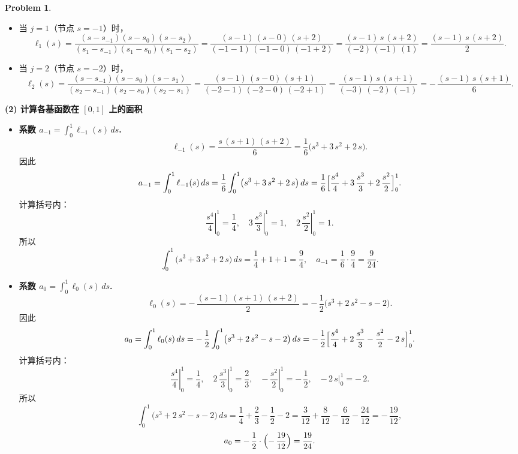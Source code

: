 \documentclass[a4paper]{article}
\theoremstyle{definition}
\newtheorem{problem}{Problem}
\theoremstyle{plain}
\newcommand{\<}{\left<}
\renewcommand{\>}{\right>}
\numberwithin{equation}{problem}
\begin{document}
\begin{problem}
\begin{itemize}
  \item 当 $j = 1$（节点 $s = -1$）时，
    \[
    \ell_{1}(s)
    = \frac{(s - s_{-1})(s - s_{0})(s - s_{2})}
           {(s_{1} - s_{-1})(s_{1} - s_{0})(s_{1} - s_{2})}
    = \frac{(s - 1)\,(s - 0)\,(s + 2)}
           {(-1 - 1)\,(-1 - 0)\,(-1 + 2)}
    = \frac{(s - 1)\,s\,(s + 2)}{(-2)\,(-1)\,(1)}
    = \frac{(s - 1)\,s\,(s + 2)}{2}.
    \]
  
  \item 当 $j = 2$（节点 $s = -2$）时，
    \[
    \ell_{2}(s)
    = \frac{(s - s_{-1})(s - s_{0})(s - s_{1})}
           {(s_{2} - s_{-1})(s_{2} - s_{0})(s_{2} - s_{1})}
    = \frac{(s - 1)\,(s - 0)\,(s + 1)}
           {(-2 - 1)\,(-2 - 0)\,(-2 + 1)}
    = \frac{(s - 1)\,s\,(s + 1)}{(-3)\,(-2)\,(-1)}
    = -\,\frac{(s - 1)\,s\,(s + 1)}{6}.
    \]
\end{itemize}

\medskip

\noindent\textbf{(2) 计算各基函数在 $[0,1]$ 上的面积}  

\begin{itemize}
  \item \textbf{系数 $a_{-1} = \displaystyle\int_{0}^{1} \ell_{-1}(s)\,ds$.}  
    \[
    \ell_{-1}(s)
    = \frac{s\,(s + 1)\,(s + 2)}{6}
    = \frac{1}{6}\bigl(s^3 + 3\,s^2 + 2\,s\bigr).
    \]
    因此
    \[
    a_{-1}
    = \int_{0}^{1} \ell_{-1}(s)\,ds
    = \frac{1}{6} \int_{0}^{1} \bigl(s^3 + 3\,s^2 + 2\,s\bigr)\,ds
    = \frac{1}{6} \Bigl[
      \frac{s^4}{4} + 3\,\frac{s^3}{3} + 2\,\frac{s^2}{2}
    \Bigr]_{0}^{1}.
    \]
    计算括号内：
    \[
    \left.\frac{s^4}{4}\right|_{0}^{1} = \frac{1}{4},\quad
    \left.3\,\frac{s^3}{3}\right|_{0}^{1} = 1,\quad
    \left.2\,\frac{s^2}{2}\right|_{0}^{1} = 1.
    \]
    所以
    \[
    \int_{0}^{1} \bigl(s^3 + 3\,s^2 + 2\,s\bigr)\,ds 
    = \frac{1}{4} + 1 + 1 
    = \frac{9}{4},
    \quad
    a_{-1} = \frac{1}{6} \cdot \frac{9}{4} = \frac{9}{24}.
    \]
  
  \item \textbf{系数 $a_{0} = \displaystyle\int_{0}^{1} \ell_{0}(s)\,ds$.}  
    \[
    \ell_{0}(s)
    = -\,\frac{(s - 1)\,(s + 1)\,(s + 2)}{2}
    = -\,\frac{1}{2}\bigl(s^3 + 2\,s^2 - s - 2\bigr).
    \]
    因此
    \[
    a_{0}
    = \int_{0}^{1} \ell_{0}(s)\,ds
    = -\,\frac{1}{2} \int_{0}^{1} \bigl(s^3 + 2\,s^2 - s - 2\bigr)\,ds
    = -\,\frac{1}{2} \Bigl[
      \frac{s^4}{4} + 2\,\frac{s^3}{3} - \frac{s^2}{2} - 2\,s
    \Bigr]_{0}^{1}.
    \]
    计算括号内：
    \[
    \left.\frac{s^4}{4}\right|_{0}^{1} = \frac{1}{4},\quad
    \left.2\,\frac{s^3}{3}\right|_{0}^{1} = \frac{2}{3},\quad
    \left.-\,\frac{s^2}{2}\right|_{0}^{1} = -\,\frac{1}{2},\quad
    \left.-\,2\,s\right|_{0}^{1} = -\,2.
    \]
    所以
    \[
    \int_{0}^{1} \bigl(s^3 + 2\,s^2 - s - 2\bigr)\,ds
    = \frac{1}{4} + \frac{2}{3} - \frac{1}{2} - 2
    = \frac{3}{12} + \frac{8}{12} - \frac{6}{12} - \frac{24}{12}
    = -\,\frac{19}{12},
    \]
    \[
    a_{0} = -\,\frac{1}{2} \cdot \Bigl(-\,\frac{19}{12}\Bigr)
    = \frac{19}{24}.
    \]
  

\end{itemize}
\end{problem}
\end{document}
